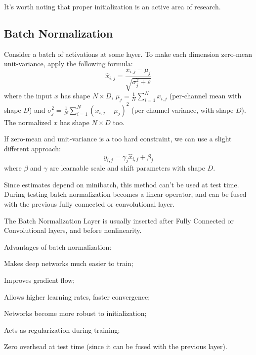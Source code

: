 It's worth noting that proper initialization is an active area of research.


\subsection{Batch Normalization}\label{sec:tnn-normalization}

Consider a batch of activations at some layer. To make each dimension zero-mean unit-variance, apply the following formula:
\begin{equation}\label{eq:tnn-normalization-1}
    \hat{x}_{i,j} = \frac{x_{i,j} - \mu_j}{\sqrt{\sigma_j^2 + \varepsilon}}
\end{equation}
where the input $x$ has shape $N \times D$, $\mu_j = \frac1N \sum_{i=1}^{N} x_{i,j}$ (per-channel mean with shape $D$) and $\sigma_j^2 = \frac1N \sum_{i=1}^{N} (x_{i,j} - \mu_j)^2$ (per-channel variance, with shape $D$). The normalized $x$ has shape $N \times D$ too.

If zero-mean and unit-variance is a too hard constraint, we can use a slight different approach:
\begin{equation}\label{eq:tnn-normalization-2}
    y_{i,j} = \gamma_j \hat{x}_{i,j} + \beta_j
\end{equation}
where $\beta$ and $\gamma$ are learnable scale and shift parameters with shape $D$.

Since estimates depend on minibatch, this method can't be used at test time. During testing batch normalization becomes a linear operator, and can be fused with the previous fully connected or convolutional layer.

The Batch Normalization Layer is usually inserted after Fully Connected or Convolutional layers, and before nonlinearity.

Advantages of batch normalization:
\begin{myitem}
    \item Makes deep networks much easier to train;
    \item Improves gradient flow;
    \item Allows higher learning rates, faster convergence;
    \item Networks become more robust to initialization;
    \item Acts as regularization during training;
    \item Zero overhead at test time (since it can be fused with the previous layer).
\end{myitem}


